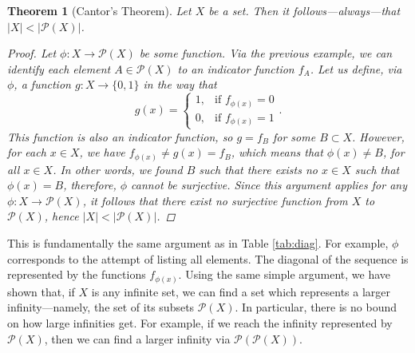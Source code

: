\documentclass[a4paper]{article}
\newtheorem{thm}{Theorem}
\theoremstyle{definition}
\begin{document}
\begin{thm}[Cantor's Theorem]
    Let $X$ be a set. Then it follows---always---that $|X| < |\mathcal{P}(X)|$. 
    \begin{proof}
        Let $\phi \colon X \to \mathcal{P}(X)$ be some function. Via the previous example, we can identify each element $A \in \mathcal{P}(X)$ to an indicator function $f_A$. Let us define, via $\phi$, a function $g \colon X \to \{0,1\}$ in the way that
        \[
            g(x) = \begin{cases}
                1, & \text{if } f_{\phi(x)} = 0 \\
                0, & \text{if } f_{\phi(x)} = 1
            \end{cases}.
        \]
        This function is also an indicator function, so $g = f_B$ for some $B \subset X$. However, for each $x \in X$, we have $f_{\phi(x)} \ne g(x) = f_B$, which means that $\phi(x) \ne B$, for all $x \in X$. In other words, we found $B$ such that there exists no $x \in X$ such that $\phi(x) = B$, therefore, $\phi$ cannot be surjective. Since this argument applies for any $\phi \colon X \to \mathcal{P}(X)$, it follows that there exist no surjective function from $X$ to $\mathcal{P}(X)$, hence $|X| < |\mathcal{P}(X)|$.
     \end{proof}
\end{thm}

This is fundamentally the same argument as in Table \ref{tab:diag}. For example, $\phi$ corresponds to the attempt of listing all elements. The diagonal of the sequence is represented by the functions $f_{\phi(x)}$. Using the same simple argument, we have shown that, if $X$ is any infinite set, we can find a set which represents a larger infinity---namely, the set of its subsets $\mathcal{P}(X)$. In particular, there is no bound on how large infinities get. For example, if we reach the infinity represented by $\mathcal{P}(X)$, then we can find a larger infinity via $\mathcal{P}(\mathcal{P}(X))$.
\end{document}
